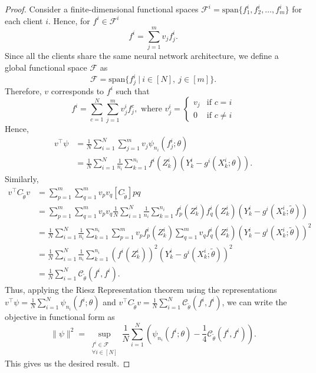 \documentclass[10pt,a4paper]{amsart}
\def\gC{{\mathcal{C}}}
\def\gF{{\mathcal{F}}}
\begin{document}
\begin{proof}
    Consider a finite-dimensional functional spaces $\gF^i=\text{span}\{f_1^i, f_2^i, \dots, f_m^i\}$ for each client $i$. Hence, for $f^i\in\gF^i$ 
    \begin{equation*}
        f^i=\sum_{j=1}^{m}v_jf^i_j.
    \end{equation*}
Since all the clients share the same neural network architecture, we define a global functional space $\gF$ as 
\begin{equation*}
    \gF=\text{span}\{f^i_j~\vert~i\in[N],~j\in[m]\}.
\end{equation*}
Therefore, $v$ corresponds to $f^i$ such that \begin{equation*}
    f^i=\sum_{c=1}^{N}\sum_{j=1}^{m}v^i_j f^c_j,
\text{ where }
    v^i_j=
 \begin{cases}
        v_j & \text{if } c =i\\
        0 & \text{if } c \neq i
    \end{cases}
    \end{equation*}
Hence, 
\begin{align*}
v^\top\psi&=\frac{1}{N}\sum_{i=1}^{N}\sum_{j=1}^{m}v_j\psi_{n_i}(f^i_j;\theta)\\
&=\frac{1}{N}\sum_{i=1}^{N}\frac{1}{n_i}\sum_{k=1}^{n_i}f^i(Z_k^i)(Y^i_k-g^i(X^i_k;\theta)).
\end{align*} 
Similarly, 
\begin{align*}
v^\top C_{\tilde{\theta}}v&=\sum_{p=1}^{m}\sum_{q=1}^{m}v_pv_q[C_{\tilde{\theta}}]pq\\
&=\sum_{p=1}^{m}\sum_{q=1}^{m}v_pv_q\frac{1}{N}\sum_{i=1}^{N}\frac{1}{n_i}\sum_{k=1}^{n_i}f^i_p(Z^i_k)f_q^i(Z_k^i)(Y_k^i-g^i(X_k^i;\tilde\theta))\\
&=\frac{1}{N}\sum_{i=1}^{N}\frac{1}{n_i}\sum_{k=1}^{n_i}\sum_{p=1}^{m}v_pf^i_p(Z^i_k)\sum_{q=1}^{m}v_q f_q^i(Z_k^i)(Y_k^i-g^i(X_k^i;\tilde\theta))^2\\
&=\frac{1}{N}\sum_{i=1}^{N}\frac{1}{n_i}\sum_{k=1}^{n_i}(f^i(Z^i_k))^2(Y_k^i-g^i(X_k^i;\tilde\theta))^2\\
&=\frac{1}{N}\sum_{i=1}^{N}\gC_{\tilde\theta}(f^i,f^i).
\end{align*}
Thus, applying the Riesz Representation theorem using the representations $v^\top\psi=\frac{1}{N}\sum_{i=1}^{N}\psi_{n_i}(f^i;\theta)$ and $v^\top C_{\tilde{\theta}}v=\frac{1}{N}\sum_{i=1}^{N}\gC_{\tilde{\theta}}(f^i,f^i)$, we can write the objective in functional form as
      \begin{equation*}
    \|\psi\|^2 = 
    \sup_{\substack{f^i\in \mathcal{F}\\ \forall i\in[N]}}
       \frac{1}{N} \sum_{i=1}^N\left( 
  \psi_{n_i}(f^i; \theta) 
    - \frac{1}{4}\mathcal{C}_{\tilde{\theta}}(f^i, f^i) 
    \right).
    \end{equation*}
This gives us the desired result.

\end{proof}
\end{document}
